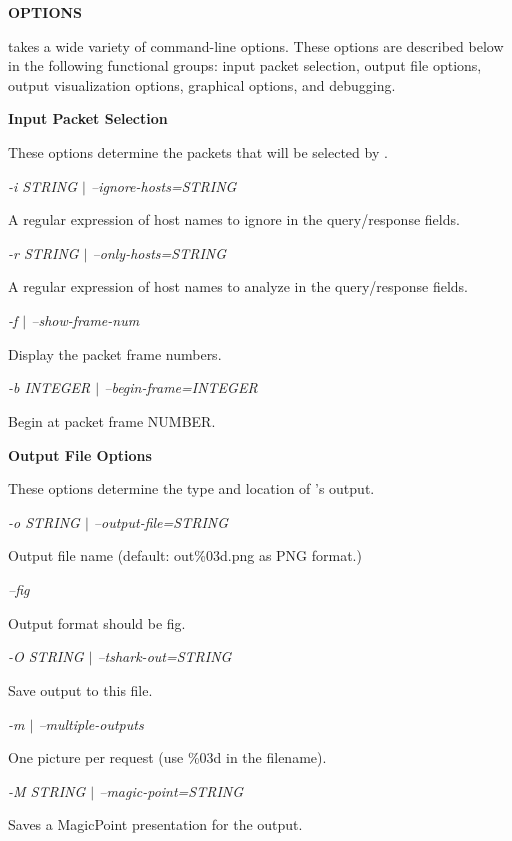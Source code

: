 {\bf OPTIONS}

 takes a wide variety of command-line options.  These options   
are described below in the following functional groups:  input packet 
selection, output file options, output visualization options, graphical 
options, and debugging.

{\bf Input Packet Selection}

These options determine the packets that will be selected by
.

\begin{description}

\item {\it -i STRING $|$ --ignore-hosts=STRING}\verb" "

A regular expression of host names to ignore in the query/response fields.

\item {\it -r STRING $|$ --only-hosts=STRING}\verb" "

A regular expression of host names to analyze in the query/response fields.

\item {\it -f $|$ --show-frame-num}\verb" "

Display the packet frame numbers.

\item {\it -b INTEGER $|$ --begin-frame=INTEGER}\verb" "

Begin at packet frame NUMBER.

\end{description}

{\bf Output File Options}

These options determine the type and location of 's output.

\begin{description}

\item {\it -o STRING $|$ --output-file=STRING}\verb" "

Output file name (default: out\%03d.png as PNG format.)

\item {\it --fig}\verb" "

Output format should be fig.

\item {\it -O STRING $|$ --tshark-out=STRING}\verb" "

Save  output to this file.

\item {\it -m $|$ --multiple-outputs}\verb" "

One picture per request (use \%03d in the filename).

\item {\it -M STRING $|$ --magic-point=STRING}\verb" "

Saves a MagicPoint presentation for the output.

\end{description}

